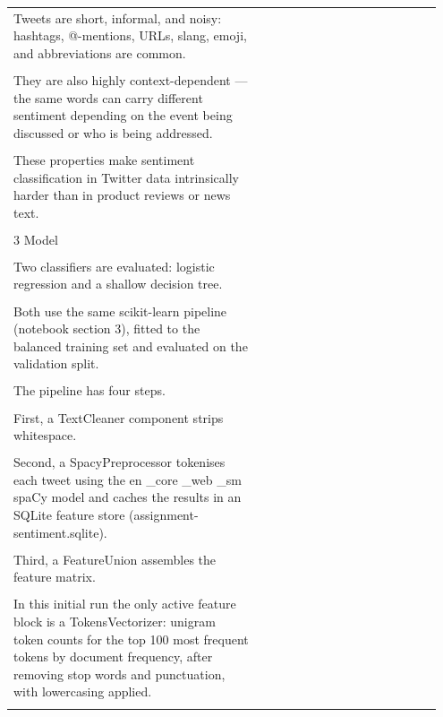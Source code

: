\documentclass[11pt]{article}
\begin{document}
\begin{longtable}{|p{0.55\linewidth}|p{0.40\linewidth}|}
\hline
\rule{0pt}{3.5cm} & \\
\hline
Tweets are short, informal, and noisy: hashtags, @-mentions, URLs, slang, emoji, and abbreviations are common. & \\[2pt]
\hline
\rule{0pt}{3.5cm} & \\
\hline
They are also highly context-dependent --- the same words can carry different sentiment depending on the event being discussed or who is being addressed. & \\[2pt]
\hline
\rule{0pt}{3.5cm} & \\
\hline
These properties make sentiment classification in Twitter data intrinsically harder than in product reviews or news text. & \\[2pt]
\hline
\rule{0pt}{3.5cm} & \\
\hline
3 Model & \\[2pt]
\hline
\rule{0pt}{3.5cm} & \\
\hline
Two classifiers are evaluated: logistic regression and a shallow decision tree. & \\[2pt]
\hline
\rule{0pt}{3.5cm} & \\
\hline
Both use the same scikit-learn pipeline (notebook section 3), fitted to the balanced training set and evaluated on the validation split. & \\[2pt]
\hline
\rule{0pt}{3.5cm} & \\
\hline
The pipeline has four steps. & \\[2pt]
\hline
\rule{0pt}{3.5cm} & \\
\hline
First, a TextCleaner component strips whitespace. & \\[2pt]
\hline
\rule{0pt}{3.5cm} & \\
\hline
Second, a SpacyPreprocessor tokenises each tweet using the en \_core \_web \_sm spaCy model and caches the results in an SQLite feature store (assignment-sentiment.sqlite). & \\[2pt]
\hline
\rule{0pt}{3.5cm} & \\
\hline
Third, a FeatureUnion assembles the feature matrix. & \\[2pt]
\hline
\rule{0pt}{3.5cm} & \\
\hline
In this initial run the only active feature block is a TokensVectorizer: unigram token counts for the top 100 most frequent tokens by document frequency, after removing stop words and punctuation, with lowercasing applied. & \\[2pt]
\hline
\rule{0pt}{3.5cm} & \\

\end{longtable}
\end{document}
